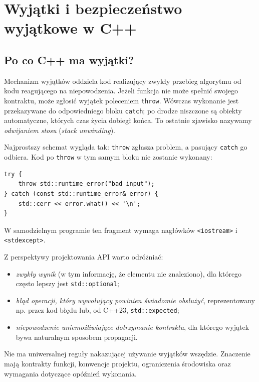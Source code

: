 
\chapter{Wyjątki i bezpieczeństwo wyjątkowe w C++}
\label{chap:cpp-exceptions}

\section{Po co C++ ma wyjątki?}

Mechanizm wyjątków oddziela kod realizujący zwykły przebieg algorytmu
od kodu reagującego na niepowodzenia. Jeżeli funkcja nie może spełnić
swojego kontraktu, może zgłosić wyjątek poleceniem \texttt{throw}.
Wówczas wykonanie jest przekazywane do odpowiedniego bloku
\texttt{catch}; po drodze niszczone są obiekty automatyczne, których
czas życia dobiegł końca. To ostatnie zjawisko nazywamy
\emph{odwijaniem stosu} (\emph{stack unwinding}).

Najprostszy schemat wygląda tak: \texttt{throw} zgłasza problem,
a pasujący \texttt{catch} go odbiera. Kod po \texttt{throw} w tym samym
bloku nie zostanie wykonany:
\begin{lstlisting}
try {
    throw std::runtime_error("bad input");
} catch (const std::runtime_error& error) {
    std::cerr << error.what() << '\n';
}
\end{lstlisting}
W samodzielnym programie ten fragment wymaga nagłówków
\texttt{<iostream>} i \texttt{<stdexcept>}.

Z perspektywy projektowania API warto odróżniać:
\begin{itemize}
\item \emph{zwykły wynik} (w tym informację, że elementu nie znaleziono),
      dla którego często lepszy jest \texttt{std::optional};
\item \emph{błąd operacji, który wywołujący powinien świadomie obsłużyć},
      reprezentowany np. przez kod błędu lub, od C++23, \texttt{std::expected};
\item \emph{niepowodzenie uniemożliwiające dotrzymanie kontraktu},
      dla którego wyjątek bywa naturalnym sposobem propagacji.
\end{itemize}
Nie ma uniwersalnej reguły nakazującej używanie wyjątków wszędzie.
Znaczenie mają kontrakty funkcji, konwencje projektu, ograniczenia
środowiska oraz wymagania dotyczące opóźnień wykonania.

